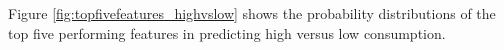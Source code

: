 Figure \ref{fig:topfivefeatures_highvslow} shows the probability distributions of the top five performing features in predicting high versus low consumption.